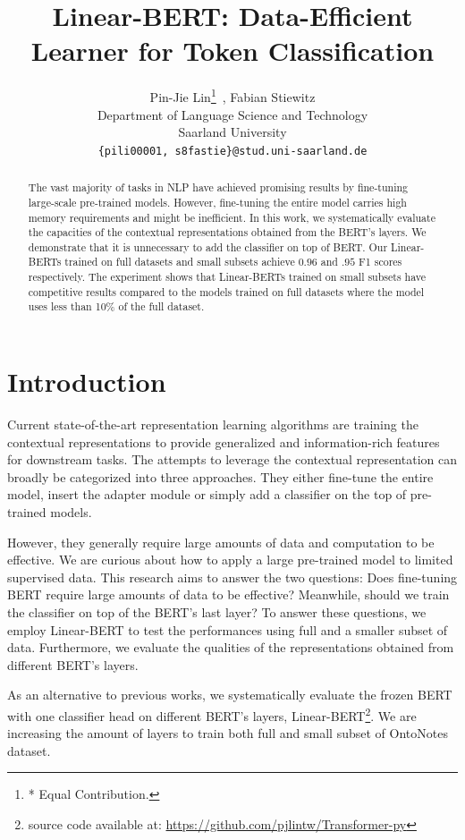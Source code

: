 \documentclass[11pt,a4paper]{article}
\title{Linear-BERT: Data-Efficient Learner for Token Classification}
\author{Pin-Jie Lin\thanks{* Equal Contribution.}\ , Fabian Stiewitz\footnotemark[1] \\
  Department of Language Science and Technology \\
  Saarland University \\
  \texttt{\{pili00001, s8fastie\}@stud.uni-saarland.de}}
\date{}
\begin{document}
\maketitle
\begin{abstract}

The vast majority of tasks in NLP have achieved promising results by fine-tuning large-scale pre-trained models. However, fine-tuning the entire model carries high memory requirements and might be inefficient. In this work, we systematically evaluate the capacities of the contextual representations obtained from the BERT's layers. We demonstrate that it is unnecessary to add the classifier on top of BERT. Our Linear-BERTs trained on full datasets and small subsets achieve $0.96$ and $.95$ F1 scores respectively. The experiment shows that Linear-BERTs trained on small subsets have competitive results compared to the models trained on full datasets where the model uses less than 10\% of the full dataset.

\end{abstract}

\section{Introduction}

Current state-of-the-art representation learning algorithms are training the contextual representations to provide generalized and information-rich features for downstream tasks. The attempts to leverage the contextual representation can broadly be categorized into three approaches. They either fine-tune the entire model, insert the adapter module or simply add a classifier on the top of pre-trained models.

However, they generally require large amounts of data and computation to be effective. We are curious about how to apply a large pre-trained model to limited supervised data. This research aims to answer the two questions: Does fine-tuning BERT require large amounts of data to be effective? Meanwhile, should we train the classifier on top of the BERT's last layer? To answer these questions, we employ Linear-BERT to test the performances using full and a smaller subset of data. Furthermore, we evaluate the qualities of the representations obtained from different BERT's layers. 

As an alternative to previous works, we systematically evaluate the frozen BERT with one classifier head on different BERT's layers, Linear-BERT\footnote{source code available at: \url{https://github.com/pjlintw/Transformer-py}}. We are increasing the amount of layers to train both full and small subset of OntoNotes dataset.
\end{document}
